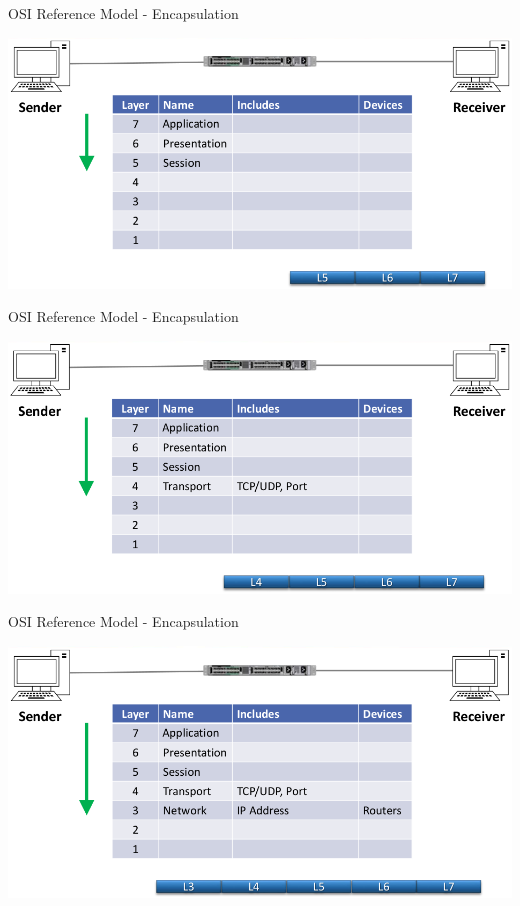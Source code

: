 \documentclass[pdflatex,compress,mathserif]{beamer}
\begin{document}
\begin{frame}{OSI Reference Model - Encapsulation}
	\begin{center}
		\includegraphics[width=\linewidth]{img/img04}
	\end{center}
\end{frame}

\begin{frame}{OSI Reference Model - Encapsulation}
	\begin{center}
		\includegraphics[width=\linewidth]{img/img05}
	\end{center}
\end{frame}

\begin{frame}{OSI Reference Model - Encapsulation}
	\begin{center}
		\includegraphics[width=\linewidth]{img/img06}
	\end{center}
\end{frame}
\end{document}
